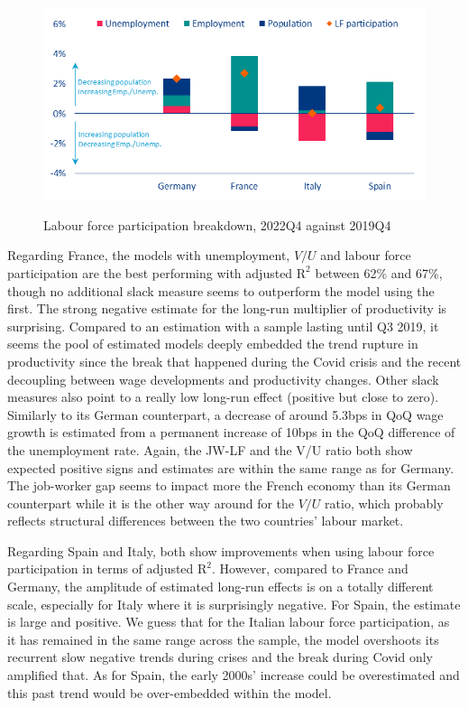 \begin{figure}[H]
    \centering
    \caption{Labour force participation breakdown, 2022Q4 against 2019Q4}
    \includegraphics[width=.7\textwidth]{Core/2.Labour/img/lfpart breakdown.png}
    \label{figure:lfpart}
\end{figure}

Regarding France, the models with unemployment, $V/U$ and labour force participation are the best performing with adjusted $\textrm{R}^{2}$ between 62\% and 67\%, though no additional slack measure seems to outperform the model using the first. 
The strong negative estimate for the long-run multiplier of productivity is surprising. 
Compared to an estimation with a sample lasting until Q3 2019, it seems the pool of estimated models deeply embedded the trend rupture in productivity since the break that happened during the Covid crisis and the recent decoupling between wage developments and productivity changes. 
Other slack measures also point to a really low long-run effect (positive but close to zero). 
Similarly to its German counterpart, a decrease of around 5.3bps in QoQ wage growth is estimated from a permanent increase of 10bps in the QoQ difference of the unemployment rate. 
Again, the JW-LF and the V/U ratio both show expected positive signs and estimates are within the same range as for Germany. 
The job-worker gap seems to impact more the French economy than its German counterpart while it is the other way around for the $V/U$ ratio, which probably reflects structural differences between the two countries’ labour market. 

Regarding Spain and Italy, both show improvements when using labour force participation in terms of adjusted $\textrm{R}^{2}$. 
However, compared to France and Germany, the amplitude of estimated long-run effects is on a totally different scale, especially for Italy where it is surprisingly negative. 
For Spain, the estimate is large and positive. 
We guess that for the Italian labour force participation, as it has remained in the same range across the sample, the model overshoots its recurrent slow negative trends during crises and the break during Covid only amplified that. 
As for Spain, the early 2000s’ increase could be overestimated and this past trend would be over-embedded within the model. 

